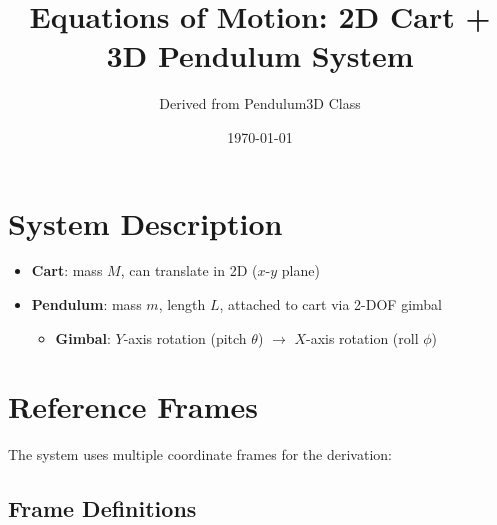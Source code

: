 \documentclass[12pt]{article}
\title{Equations of Motion: 2D Cart + 3D Pendulum System}
\author{Derived from Pendulum3D Class}
\date{\today}
\begin{document}
\maketitle

\section{System Description}

\begin{itemize}
    \item \textbf{Cart}: mass $M$, can translate in 2D ($x$-$y$ plane)
    \item \textbf{Pendulum}: mass $m$, length $L$, attached to cart via 2-DOF gimbal
    \begin{itemize}
        \item \textbf{Gimbal}: $Y$-axis rotation (pitch $\theta$) $\rightarrow$ $X$-axis rotation (roll $\phi$)
    \end{itemize}
\end{itemize}

\section{Reference Frames}

The system uses multiple coordinate frames for the derivation:

\subsection{Frame Definitions}
\end{document}
